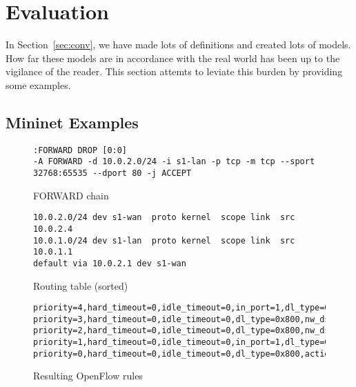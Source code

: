 \section{Evaluation}\label{sec:eval}
In Section~\ref{sec:conv}, we have made lots of definitions and created lots of models.
How far these models are in accordance with the real world has been up to the vigilance of the reader.
This section attemts to leviate this burden by providing some examples.

\subsection{Mininet Examples}
\label{sec:mnex}
\begin{figure*}
\centering
\begin{subfigure}[b]{0.45\textwidth}
\begin{lstlisting}
:FORWARD DROP [0:0]
-A FORWARD -d 10.0.2.0/24 -i s1-lan -p tcp -m tcp --sport 32768:65535 --dport 80 -j ACCEPT
\end{lstlisting}
\caption{FORWARD chain}
\end{subfigure}
\hspace{0.05\textwidth}
\begin{subfigure}[b]{0.45\textwidth}
\begin{lstlisting}
10.0.2.0/24 dev s1-wan  proto kernel  scope link  src 10.0.2.4
10.0.1.0/24 dev s1-lan  proto kernel  scope link  src 10.0.1.1
default via 10.0.2.1 dev s1-wan
\end{lstlisting}
\caption{Routing table (sorted)}
\end{subfigure}
\begin{subfigure}{\textwidth}
\begin{lstlisting}
priority=4,hard_timeout=0,idle_timeout=0,in_port=1,dl_type=0x800,nw_proto=6,nw_dst=10.0.2.0/24,tp_src=32768/0x8000,tp_dst=80,action=output:2
priority=3,hard_timeout=0,idle_timeout=0,dl_type=0x800,nw_dst=10.0.2.0/24,action=drop
priority=2,hard_timeout=0,idle_timeout=0,dl_type=0x800,nw_dst=10.0.1.0/24,action=drop
priority=1,hard_timeout=0,idle_timeout=0,in_port=1,dl_type=0x800,nw_proto=6,nw_dst=10.0.2.0/24,tp_src=32768/0x8000,tp_dst=80,action=output:2
priority=0,hard_timeout=0,idle_timeout=0,dl_type=0x800,action=drop
\end{lstlisting}
\caption{Resulting OpenFlow rules}
\end{subfigure}
\caption{Example Network 1 -- Configuration}
\label{fig:exn1}
\end{figure*}
